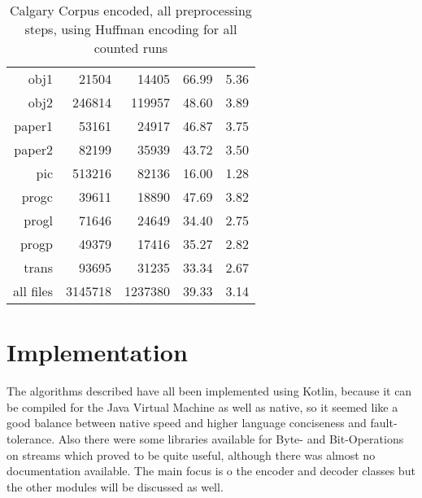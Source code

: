 {{{\begin{table}[h]
\begin{tabular}{r|r|r|r|r}
obj1 & 21504 & 14405 & 66.99 & 5.36 \\
obj2 & 246814 & 119957 & 48.60 & 3.89 \\
paper1 & 53161 & 24917 & 46.87 & 3.75 \\
paper2 & 82199 & 35939 & 43.72 & 3.50 \\
pic & 513216 & 82136 & 16.00 & 1.28 \\
progc & 39611 & 18890 & 47.69 & 3.82 \\
progl & 71646 & 24649 & 34.40 & 2.75 \\
progp & 49379 & 17416 & 35.27 & 2.82 \\
trans & 93695 & 31235 & 33.34 & 2.67 \\
			\hline
			all files & 3145718 & 1237380 & 39.33 & 3.14
		\end{tabular}
		\caption{Calgary Corpus encoded, all preprocessing steps, using Huffman encoding for all counted runs}
		\label{tab:t6:Calgary Corpus encoded, all preprocessing steps, using Huffman encoding for all counted runs}
	\end{table}
\section{Implementation}
\label{ch:Conceptual Design:sec:Implementation Decisions}

The algorithms described have all been implemented using Kotlin, because it can be compiled for the Java Virtual Machine as well as native, so it seemed like a good balance between native speed and higher language conciseness and fault-tolerance. Also there were some libraries available for Byte- and Bit-Operations on streams which proved to be quite useful, although there was almost no documentation available. The main focus is o the encoder and decoder classes but the other modules will be discussed as well.

}}}
